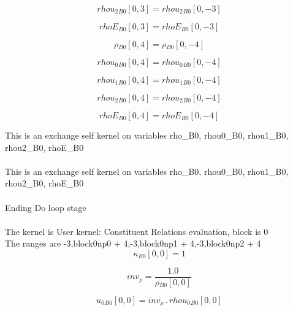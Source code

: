 \documentclass{article}
\begin{document}
\begin{dmath}{rhou_{2}{_{B0}}}[{0,3}] = {rhou_{2}{_{B0}}}[{0,-3}]\end{dmath}

\begin{dmath}{rhoE{_{B0}}}[{0,3}] = {rhoE{_{B0}}}[{0,-3}]\end{dmath}

\begin{dmath}{\rho{_{B0}}}[{0,4}] = {\rho{_{B0}}}[{0,-4}]\end{dmath}

\begin{dmath}{rhou_{0}{_{B0}}}[{0,4}] = {rhou_{0}{_{B0}}}[{0,-4}]\end{dmath}

\begin{dmath}{rhou_{1}{_{B0}}}[{0,4}] = {rhou_{1}{_{B0}}}[{0,-4}]\end{dmath}

\begin{dmath}{rhou_{2}{_{B0}}}[{0,4}] = {rhou_{2}{_{B0}}}[{0,-4}]\end{dmath}

\begin{dmath}{rhoE{_{B0}}}[{0,4}] = {rhoE{_{B0}}}[{0,-4}]\end{dmath}

\noindent This is an exchange self kernel on variables rho_B0, rhou0_B0, rhou1_B0, rhou2_B0, rhoE_B0\\\\\noindent This is an exchange self kernel on variables rho_B0, rhou0_B0, rhou1_B0, rhou2_B0, rhoE_B0\\\\\noindent Ending Do loop stage\\
\\\noindent The kernel is User kernel: Constituent Relations evaluation, block is 0\\\noindent The ranges are -3,block0np0 + 4,-3,block0np1 + 4,-3,block0np2 + 4\\\begin{dmath}{\kappa{_{B0}}}[{0,0}] = 1\end{dmath}

\begin{dmath}inv_{\rho} = \frac{1.0}{{\rho{_{B0}}}[{0,0}]}\end{dmath}

\begin{dmath}{u_{0}{_{B0}}}[{0,0}] = inv_{\rho} \,.\, {rhou_{0}{_{B0}}}[{0,0}]\end{dmath}
\end{document}
